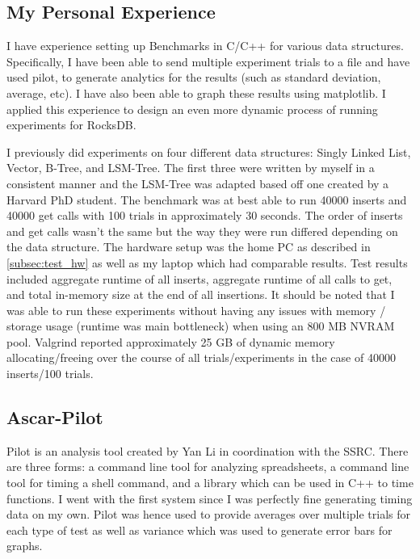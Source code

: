 \documentclass[twocolumn,11pt]{article}
\begin{document}
\subsection{My Personal Experience}
\label{subsec:personal_experience}

I have experience setting up Benchmarks in C/C++ for various data structures.
Specifically, I have been able to send multiple experiment trials to a file and
have used pilot, to generate analytics for the results (such as standard
deviation, average, etc). I have also been able to graph these results using
matplotlib. I applied this experience to design an even more dynamic process of
running experiments for RocksDB.

I previously did experiments on four different data structures: Singly Linked
List, Vector, B-Tree, and LSM-Tree. The first three were written by myself in a
consistent manner and the LSM-Tree was adapted based off one created by a
Harvard PhD student. The benchmark was at best able to run 40000 inserts and
40000 get calls with 100 trials in approximately 30 seconds. The order of
inserts and get calls wasn't the same but the way they were run differed
depending on the data structure. The hardware setup was the home PC as described
in \ref{subsec:test_hw} as well as my laptop which had comparable results. Test
results included aggregate runtime of all inserts, aggregate runtime of all
calls to get, and total in-memory size at the end of all insertions. It should
be noted that I was able to run these experiments without having any issues with
memory / storage usage (runtime was main bottleneck) when using an 800 MB NVRAM
pool. Valgrind reported approximately 25 GB of dynamic memory allocating/freeing
over the course of all trials/experiments in the case of 40000 inserts/100
trials.

\subsection{Ascar-Pilot}

Pilot\cite{li:pilot} is an analysis tool created by Yan Li in coordination with
the SSRC. There are three forms: a command line tool for analyzing spreadsheets,
a command line tool for timing a shell command, and a library which can be used
in C++ to time functions. I went with the first system since I was perfectly
fine generating timing data on my own. Pilot was hence used to provide averages
over multiple trials for each type of test as well as variance which was used to
generate error bars for graphs.
\end{document}
